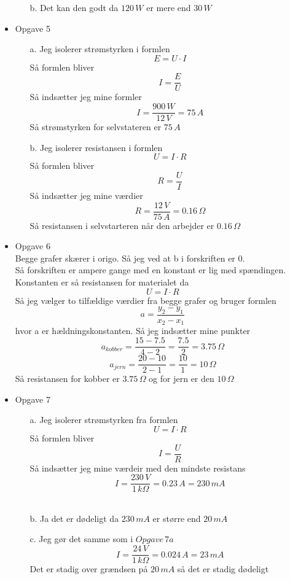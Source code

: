 \documentclass[12pt]{article}
\begin{document}
\begin{itemize}
\begin{enumerate}
    \item[b.] Det kan den godt da $120\, W$ er mere end $30\, W$\\
  \end{enumerate}

  \item{Opgave 5}
  \begin{enumerate}
    \item[a.] Jeg isolerer strømstyrken i formlen
    $$
    E = U \cdot I
    $$
    Så formlen bliver
    $$
    I = \frac{E}{U}
    $$
    Så indsætter jeg mine formler
    $$
    I = \frac{900\, W}{12\, V} = 75\, A
    $$
    Så strømstyrken for selvstateren er $75\, A$\\

    \item[b.] Jeg isolerer resistansen i formlen
    $$
    U = I \cdot R
    $$
    Så formlen bliver
    $$
    R = \frac{U}{I}
    $$
    Så indsætter jeg mine værdier
    $$
    R = \frac{12\, V}{75\, A} = 0.16\, \Omega
    $$
    Så resistansen i selvstarteren når den arbejder er $0.16\, \Omega$\\
  \end{enumerate}

  \item{Opgave 6}\\
  Begge grafer skærer i origo. Så jeg ved at b i forskriften er 0.\\
  Så forskriften er ampere gange med en konstant er lig med spændingen. Konstanten er så resistansen for materialet da
  $$
  U = I \cdot R
  $$
  Så jeg vælger to tilfældige værdier fra begge grafer og bruger formlen
  $$
  a = \frac{y_2 - y_1}{x_2 - x_1}
  $$
  hvor a er hældningskonstanten. Så jeg indsætter mine punkter
  $$
  a_{kobber} = \frac{15-7.5}{4-2} = \frac{7.5}{2} = 3.75\, \Omega
  $$
  $$
  a_{jern} = \frac{20-10}{2-1} = \frac{10}{1} = 10\, \Omega
  $$
  Så resistansen for kobber er $3.75\, \Omega$ og for jern er den $10\, \Omega$\\

  \item{Opgave 7}
  \begin{enumerate}
    \item[a.] Jeg isolerer strømstyrken fra formlen
    $$
    U = I \cdot R
    $$
    Så formlen bliver
    $$
    I = \frac{U}{R}
    $$
    Så indsætter jeg mine værdeir med den mindste resistans
    $$
    I = \frac{230\, V}{1\, k\Omega} = 0.23\, A = 230\, mA
    $$\\

    \item[b.] Ja det er dødeligt da $230\, mA$ er større end $20\, mA$\\
    \item[c.] Jeg gør det samme som i $Opgave\, 7a$
    $$
    I = \frac{24\, V}{1\, k\Omega} = 0.024\, A = 23\, mA
    $$
    Det er stadig over grændsen på $20\, mA$ så det er stadig dødeligt
  \end{enumerate}
\end{itemize}
\end{document}
